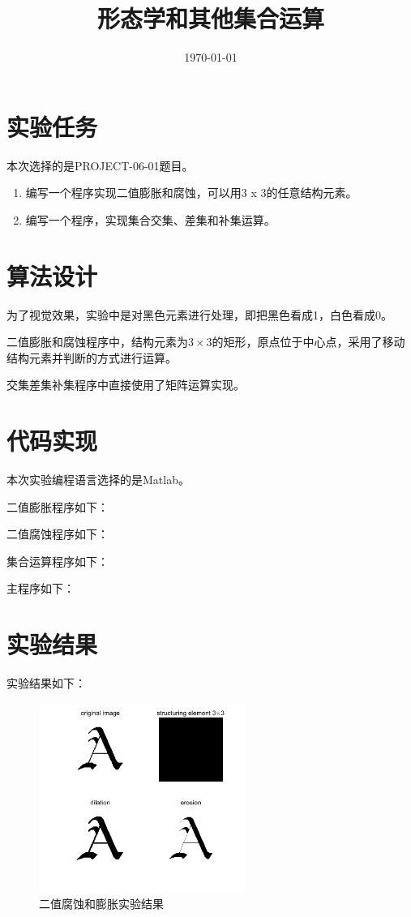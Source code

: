 \documentclass{../source/Experiment}
\title{形态学和其他集合运算}
\date{\today}
\begin{document}
\makecover
\section{实验任务}

本次选择的是PROJECT-06-01题目。

\begin{enumerate}
    \item 编写一个程序实现二值膨胀和腐蚀，可以用3 x 3的任意结构元素。
    \item 编写一个程序，实现集合交集、差集和补集运算。
\end{enumerate}

\section{算法设计}

为了视觉效果，实验中是对黑色元素进行处理，即把黑色看成1，白色看成0。

二值膨胀和腐蚀程序中，结构元素为$3\times3$的矩形，原点位于中心点，采用了移动结构元素并判断的方式进行运算。

交集差集补集程序中直接使用了矩阵运算实现。

\section{代码实现}
本次实验编程语言选择的是Matlab。

二值膨胀程序如下：


二值腐蚀程序如下：



集合运算程序如下：


主程序如下：



\section{实验结果}
实验结果如下：

\begin{figure}[H]
    \centering
    \includegraphics[width = 0.6\textwidth]{第四次/f1.png}
    \caption{二值腐蚀和膨胀实验结果}
\end{figure}
\end{document}
